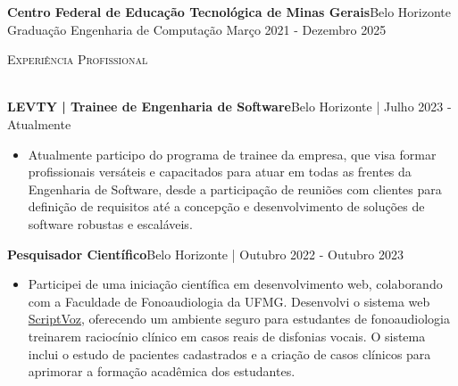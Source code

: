 \documentclass[a4paper]{article}
\newcommand{\lineunder} {
    \vspace*{-8pt} \\
    \hspace*{-18pt} \hrulefill \\
}
\newcommand{\header} [1] {
    {\hspace*{-18pt}\vspace*{6pt} \textsc{#1}}
    \vspace*{-6pt} \lineunder
}
\begin{document}
\vspace{2mm}
\textbf{Centro Federal de Educação Tecnológica de Minas Gerais}\hfill Belo Horizonte\\
Graduação Engenharia de Computação \hfill Março 2021 - Dezembro 2025\\

\vspace{2mm}

%
%
\header{Experiência Profissional}
\vspace{2mm}

\textbf{LEVTY | Trainee de Engenharia de Software}\hfill Belo Horizonte | Julho 2023 - Atualmente\\
\vspace{-4mm}
\begin{itemize} \itemsep -1pt
    \vspace{2mm}
    \item[] Atualmente participo do programa de trainee da empresa, que visa formar profissionais versáteis e capacitados para atuar em todas as frentes da Engenharia de Software, desde a participação de reuniões com clientes para definição de requisitos até a concepção e desenvolvimento de soluções de software robustas e escaláveis.
\end{itemize}

\textbf{Pesquisador Científico}\hfill Belo Horizonte | Outubro 2022 - Outubro 2023\\
\vspace{-4mm}
\begin{itemize} \itemsep -1pt
    \vspace{2mm}
    \item[] Participei de uma iniciação científica em desenvolvimento web, colaborando com a Faculdade de Fonoaudiologia da UFMG. Desenvolvi o sistema web \href{http://scriptvoz.medicina.ufmg.br/}{ScriptVoz}, oferecendo um ambiente seguro para estudantes de fonoaudiologia treinarem raciocínio clínico em casos reais de disfonias vocais. O sistema inclui o estudo de pacientes cadastrados e a criação de casos clínicos para aprimorar a formação acadêmica dos estudantes.
\end{itemize}

\end{document}
